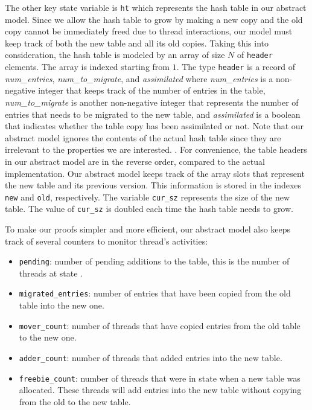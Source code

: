 The other key state variable is \texttt{ht} which represents the hash
table in our abstract model.  Since we allow the hash table to grow by
making a new copy and the old copy cannot be immediately freed due to
thread interactions, our model must keep track of both the new table
and all its old copies. Taking this into consideration, the hash table
is modeled by an array of size $N$ of \texttt{header} elements. The
array is indexed starting from $1$. The type \texttt{header} is a
record of \emph{num\_entries}, \emph{num\_to\_migrate}, and
\emph{assimilated} where \emph{num\_entries} is a non-negative integer
that keeps track of the number of entries in the table,
\emph{num\_to\_migrate} is another non-negative integer that
represents the number of entries that needs to be migrated to the new
table, and \emph{assimilated} is a boolean that indicates whether the
table copy has been assimilated or not. Note that our abstract model
ignores the contents of the actual hash table since they are
irrelevant to the properties we are interested. . For convenience, the table headers in our abstract model
are in the reverse order, compared to the actual implementation.  Our
abstract model keeps track of the array slots that represent the new
table and its previous version. This information is stored in the
indexes \texttt{new} and \texttt{old}, respectively. The variable
\texttt{cur\_sz} represents the size of the new table. The value of
\texttt{cur\_sz} is doubled each time the hash table needs to grow.

To make our proofs simpler and more efficient, our abstract model also
keeps track of several counters to monitor thread's activities:

\begin{itemize}

\item \texttt{pending}: number of pending additions to the table, this
  is the number of threads at state \pcone.

\item \texttt{migrated\_entries}: number of entries that have been
  copied from the old table into the new one.

\item \texttt{mover\_count}: number of threads that have copied
  entries from the old table to the new one.

\item \texttt{adder\_count}: number of threads that added entries into
  the new table.
  
\item \texttt{freebie\_count}: number of threads that were in state
  \pcone when a new table was allocated. These threads will add
  entries into the new table without copying from the old to the new
  table.

\end{itemize}  

